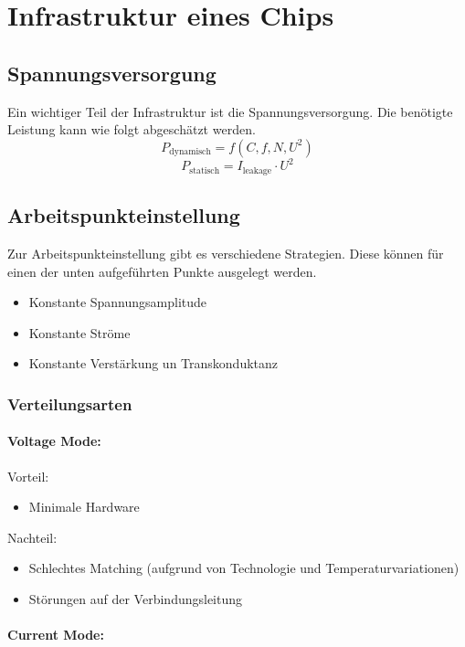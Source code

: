 \section{Infrastruktur eines Chips}

\subsection{Spannungsversorgung}
Ein wichtiger Teil der Infrastruktur ist die Spannungsversorgung. 
Die benötigte Leistung kann wie folgt abgeschätzt werden.
\[
    P_\mathrm{dynamisch} = f(C, f, N, U^2)
\]
\[
    P_\mathrm{statisch} = I_\mathrm{leakage} \cdot U^2
\]

\subsection{Arbeitspunkteinstellung}
Zur Arbeitspunkteinstellung gibt es verschiedene Strategien.
Diese können für einen der unten aufgeführten Punkte ausgelegt werden.
\begin{itemize}
    \item Konstante Spannungsamplitude
    \item Konstante Ströme
    \item Konstante Verstärkung un Transkonduktanz
\end{itemize}

\subsubsection{Verteilungsarten}
\paragraph{Voltage Mode:}

Vorteil:
\begin{itemize}
    \item Minimale Hardware
\end{itemize}
Nachteil:
\begin{itemize}
    \item Schlechtes Matching (aufgrund von Technologie und Temperaturvariationen)
    \item Störungen auf der Verbindungsleitung
\end{itemize}

\paragraph{Current Mode:}

